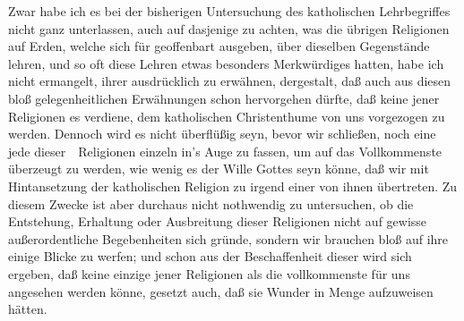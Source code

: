 Zwar habe ich es bei der bisherigen Untersuchung des katholischen Lehrbegriffes nicht ganz unterlassen, auch auf dasjenige zu achten, was die übrigen Religionen auf Erden, welche sich für geoffenbart ausgeben, über dieselben Gegenstände lehren, und so oft diese Lehren etwas besonders Merkwürdiges hatten, habe ich nicht ermangelt, ihrer ausdrücklich zu erwähnen, dergestalt, daß auch aus diesen bloß gelegenheitlichen Erwähnungen schon hervorgehen dürfte, daß keine jener Religionen es verdiene, dem katholischen Christenthume von uns vorgezogen zu werden. Dennoch wird es nicht überflüßig seyn, bevor wir schließen, noch eine jede dieser~\ Religionen einzeln in's Auge zu fassen, um auf das Vollkommenste überzeugt zu werden, wie wenig es der Wille Gottes seyn könne, daß wir mit Hintansetzung der katholischen Religion zu irgend einer von ihnen übertreten. Zu diesem Zwecke ist aber durchaus nicht nothwendig zu untersuchen, ob die Entstehung, Erhaltung oder Ausbreitung dieser Religionen nicht auf gewisse außerordentliche Begebenheiten sich gründe, sondern wir brauchen bloß auf ihre  einige Blicke zu werfen; und schon aus der Beschaffenheit dieser wird sich ergeben, daß keine einzige jener Religionen als die vollkommenste für uns angesehen werden könne, gesetzt auch, daß sie Wunder in Menge aufzuweisen hätten.
